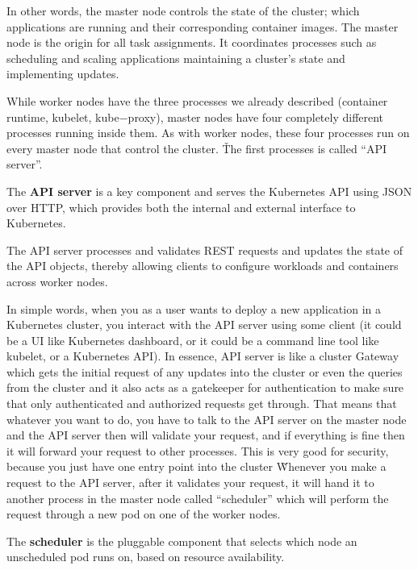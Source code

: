 In other words, the master node controls the state of the cluster; which applications are running and their
corresponding container images. The master node is the origin for all task assignments. It coordinates processes such
as scheduling and scaling applications maintaining a cluster’s state and implementing updates.


While worker nodes have the three processes we already described (container runtime, kubelet, kube$-$proxy), master
nodes have four completely different processes running inside them. As with worker nodes, these four processes run on
every master node that control the cluster. \v

The first processes is called ``API server''.

The \textbf{API server} is a key component and serves the Kubernetes API using JSON over HTTP, which provides both the
internal and external interface to Kubernetes.
\ed

The API server processes and validates REST requests and updates the state of the API objects, thereby allowing
clients to configure workloads and containers across worker nodes.


In simple words, when you as a user wants to deploy a new application in a Kubernetes cluster, you interact with the
API server using some client (it could be a UI like Kubernetes dashboard, or it could be a command line tool like
kubelet, or a Kubernetes API). In essence, API server is like a cluster Gateway which gets the initial request of any
updates into the cluster or even the queries from the cluster and it also acts as a gatekeeper for authentication to
make sure that only authenticated and authorized requests get through. That means that whatever you want to do, you
have to talk to the API server on the master node and the API server then will validate your request, and if
everything is fine then it will forward your request to other processes. This is very good for security, because you
just have one entry point into the cluster \v

Whenever you make a request to the API server, after it validates your request, it will hand it to another process in
the master node called ``scheduler'' which will perform the request through a new pod on one of the worker nodes.

\bd[Scheduler]
The \textbf{scheduler} is the pluggable component that selects which node an unscheduled pod runs on, based on resource 
availability.
\ed

